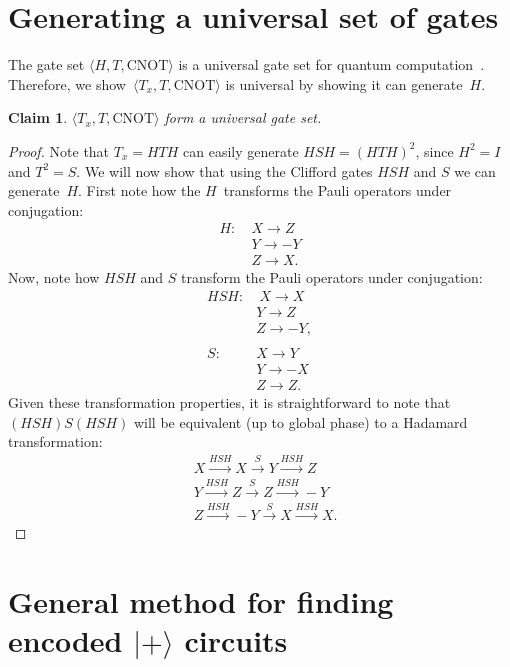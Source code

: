\documentclass[pra,longbibliography,twocolumn,showpacs,nofootinbib,superscriptaddress,notitlepage]{revtex4-1}
\newtheorem{claim}{Claim} \newtheorem{definition}{Definition}
\begin{document}
\section{Generating a universal set of gates}
\label{app:CliffordGenerating}

The gate set $\langle H, T, \text{CNOT} \rangle$ is a universal gate set for quantum computation~\cite{BMPRV99}. Therefore, we show~$\langle T_x, T, \text{CNOT} \rangle$ is universal by showing it can generate~$H$.

\begin{claim}
$\langle T_x, T, \text{CNOT} \rangle$ form a universal gate set.
\end{claim}

\begin{proof}
Note that $T_x = HTH$ can easily generate $HSH = (HTH)^2$, since $H^2 = I$ and $T^2 = S$. We will now show that using the Clifford gates $HSH$ and $S$ we can generate~$H$. First note how the $H$~transforms the Pauli operators under conjugation:
\begin{align*}
H : \ & X \rightarrow Z \\
& Y \rightarrow -Y \\
& Z \rightarrow X.
\end{align*}
Now, note how $HSH$ and $S$ transform the Pauli operators under conjugation:
\begin{align*}
HSH : & \ X \rightarrow X \\
& Y \rightarrow Z  \\
& Z \rightarrow -Y , \\
\\
S : \  &  X \rightarrow Y \\
& Y \rightarrow -X \\
& Z \rightarrow Z. 
\end{align*}
Given these transformation properties, it is straightforward to note that $(HSH)S(HSH)$ will be equivalent (up to global phase) to a Hadamard transformation:
\begin{align*}
&X \xrightarrow{HSH} X \xrightarrow{S} Y \xrightarrow{HSH} Z \\
&Y \xrightarrow{HSH} Z \xrightarrow{S} Z \xrightarrow{HSH} -Y \\
&Z \xrightarrow{HSH} -Y \xrightarrow{S} X \xrightarrow{HSH} X.
\end{align*}
\end{proof}

\section{General method for finding encoded $|+\rangle$ circuits}
\label{app:EncodedCircuits}
\end{document}
